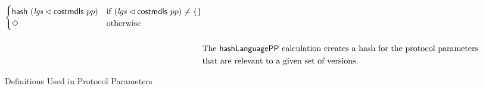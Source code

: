 \begin{figure*}[htb]
\begin{align*}
\begin{cases}
         \mathsf{hash}~(\mathit{lgs} \lhd \mathsf{costmdls}~{pp})
                           & \text{if~} (\mathit{lgs} \lhd \mathsf{costmdls}~{pp}) \neq \{\} \\
              \Diamond & \text{otherwise} \\
      \end{cases} \\[3ex]
    & \text{The $\mathsf{hashLanguagePP}$ calculation creates a hash for the protocol parameters} \\ & \text{that are relevant to
    a given set of versions.}
  \end{align*}
  \caption{Definitions Used in Protocol Parameters}
  \label{fig:defs:protocol-parameters}
\end{figure*}


\clearpage
